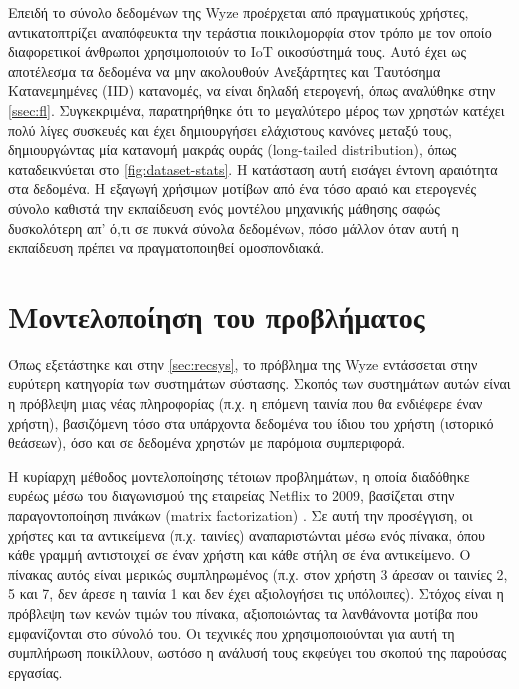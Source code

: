 Επειδή το σύνολο δεδομένων της Wyze προέρχεται από πραγματικούς χρήστες, αντικατοπτρίζει αναπόφευκτα την τεράστια ποικιλομορφία στον τρόπο με τον οποίο διαφορετικοί άνθρωποι χρησιμοποιούν το IoT οικοσύστημά τους. Αυτό έχει ως αποτέλεσμα τα δεδομένα να μην ακολουθούν Ανεξάρτητες και Ταυτόσημα Κατανεμημένες (IID) κατανομές, να είναι δηλαδή ετερογενή, όπως αναλύθηκε στην \autoref{ssec:fl}. Συγκεκριμένα, παρατηρήθηκε ότι το μεγαλύτερο μέρος των χρηστών κατέχει πολύ λίγες συσκευές και έχει δημιουργήσει ελάχιστους κανόνες μεταξύ τους, δημιουργώντας μία κατανομή μακράς ουράς (long-tailed distribution), όπως καταδεικνύεται στο \autoref{fig:dataset-stats}. Η κατάσταση αυτή εισάγει έντονη αραιότητα στα δεδομένα. Η εξαγωγή χρήσιμων μοτίβων από ένα τόσο αραιό και ετερογενές σύνολο καθιστά την εκπαίδευση ενός μοντέλου μηχανικής μάθησης σαφώς δυσκολότερη απ' ό,τι σε πυκνά σύνολα δεδομένων, πόσο μάλλον όταν αυτή η εκπαίδευση πρέπει να πραγματοποιηθεί ομοσπονδιακά.

\section{Μοντελοποίηση του προβλήματος}\label{sec:problem-model}
Όπως εξετάστηκε και στην \autoref{sec:recsys}, το πρόβλημα της Wyze εντάσσεται στην ευρύτερη κατηγορία των συστημάτων σύστασης. Σκοπός των συστημάτων αυτών είναι η πρόβλεψη μιας νέας πληροφορίας (π.χ. η επόμενη ταινία που θα ενδιέφερε έναν χρήστη), βασιζόμενη τόσο στα υπάρχοντα δεδομένα του ίδιου του χρήστη (ιστορικό θεάσεων), όσο και σε δεδομένα χρηστών με παρόμοια συμπεριφορά.

Η κυρίαρχη μέθοδος μοντελοποίησης τέτοιων προβλημάτων, η οποία διαδόθηκε ευρέως μέσω του διαγωνισμού της εταιρείας Netflix το 2009, βασίζεται στην παραγοντοποίηση πινάκων (matrix factorization) \cite{koren_matrix_2009}. Σε αυτή την προσέγγιση, οι χρήστες και τα αντικείμενα (π.χ. ταινίες) αναπαριστώνται μέσω ενός πίνακα, όπου κάθε γραμμή αντιστοιχεί σε έναν χρήστη και κάθε στήλη σε ένα αντικείμενο. Ο πίνακας αυτός είναι μερικώς συμπληρωμένος (π.χ. στον χρήστη 3 άρεσαν οι ταινίες 2, 5 και 7, δεν άρεσε η ταινία 1 και δεν έχει αξιολογήσει τις υπόλοιπες). Στόχος είναι η πρόβλεψη των κενών τιμών του πίνακα, αξιοποιώντας τα λανθάνοντα μοτίβα που εμφανίζονται στο σύνολό του. Οι τεχνικές που χρησιμοποιούνται για αυτή τη συμπλήρωση ποικίλλουν, ωστόσο η ανάλυσή τους εκφεύγει του σκοπού της παρούσας εργασίας.

